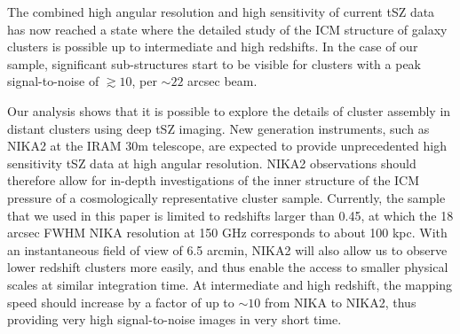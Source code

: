 \documentclass[twocolumn,traditabstract]{aa}
\begin{document}
The combined high angular resolution and high sensitivity of current tSZ data has now reached a state where the detailed study of the ICM structure of galaxy clusters is possible up to intermediate and high redshifts. In the case of our sample, significant sub-structures start to be visible for clusters with a peak signal-to-noise of $\gtrsim 10$, per $\sim 22$ arcsec beam.

Our analysis shows that it is possible to explore the details of cluster assembly in distant clusters using deep tSZ imaging. New generation instruments, such as NIKA2 \citep{Calvo2016,Catalano2016,NIKA2017} at the IRAM 30m telescope, are expected to provide unprecedented high sensitivity tSZ data at high angular resolution. NIKA2 observations \citep[such as the ones of the tSZ large program,][]{Comis2016} should therefore allow for in-depth investigations of the inner structure of the ICM pressure of a cosmologically representative cluster sample. Currently, the sample that we used in this paper is limited to redshifts larger than 0.45, at which the 18 arcsec FWHM NIKA resolution at 150 GHz corresponds to about 100 kpc. With an instantaneous field of view of 6.5 arcmin, NIKA2 will also allow us to observe lower redshift clusters more easily, and thus enable the access to smaller physical scales at similar integration time. At intermediate and high redshift, the mapping speed should increase by a factor of up to $\sim 10$ from NIKA to NIKA2, thus providing very high signal-to-noise images in very short time.
\end{document}
